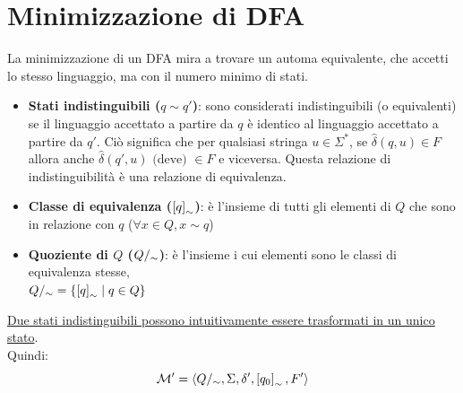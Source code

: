 \documentclass[12pt, a4paper]{report}
\begin{document}
        \section{Minimizzazione di DFA}
            La minimizzazione di un DFA mira a trovare un automa equivalente, che accetti lo stesso linguaggio, ma con il numero minimo di stati.
            \begin{itemize}
                \item \textbf{Stati indistinguibili ($q\sim q'$)}: sono considerati indistinguibili (o equivalenti) se il linguaggio accettato a partire da $q$ è identico al linguaggio accettato a partire da $q'$. Ciò significa che per qualsiasi stringa $u\in\Sigma^*$, se $\hat{\delta}(q,u)\in F$ allora anche $\hat{\delta}(q',u)\text{ (deve) }\in F$ e viceversa. Questa relazione di indistinguibilità è una relazione di equivalenza.
                \item \textbf{Classe di equivalenza ($\left[q\right]_\sim$)}: è l'insieme di tutti gli elementi di $Q$ che sono in relazione con $q$ ($\forall x\in Q, x\sim q$)
                \item \textbf{Quoziente di $Q$ ($Q/_\sim$)}: è l'insieme i cui elementi sono le classi di equivalenza stesse,\\
                $Q/_\sim=\{\left[q\right]_\sim\mid q\in Q\}$
            \end{itemize}
            \underline{Due stati indistinguibili possono intuitivamente essere trasformati in un unico stato}.\\
            Quindi:
            \begin{equation*}
                \mathcal{M'}=\langle Q/_\sim,\Sigma,\delta',\left[q_0\right]_\sim,F'\rangle
            \end{equation*}
\end{document}
